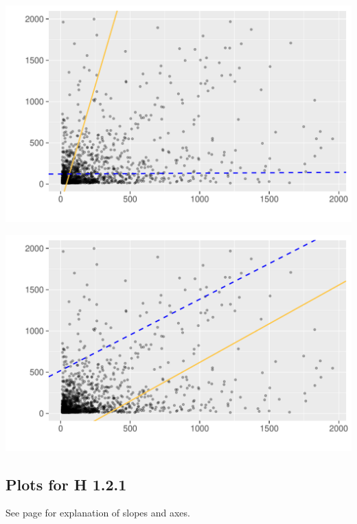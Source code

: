 \begin{minipage}{.5\textwidth}
	\centering
	\includegraphics[page=1,scale=0.3]{../hypotheses/lm_in_ext_model_9_10.pdf}
  \label{fig:hyp1_model_9-10}
\end{minipage}
\begin{minipage}{.5\textwidth}
	\centering
	\includegraphics[page=1,scale=0.3]{../hypotheses/lm_in_ext_model_11_12.pdf}
  \label{fig:hyp1_model_11-12}
\end{minipage}





\subsection{Plots for H 1.2.1}
\label{sec:h_1.2.1_plots}

See page \pageref{sec:lm_plots_description} for explanation of slopes and axes.

